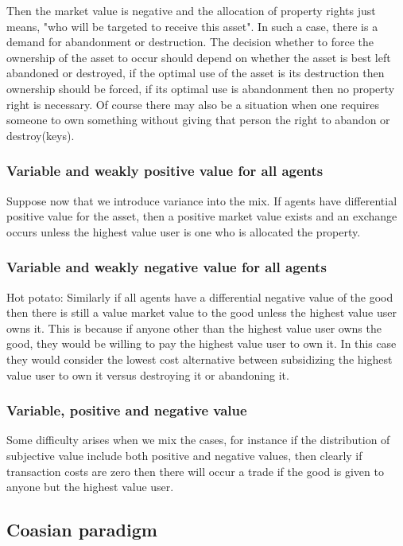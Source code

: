 \documentclass[12pt]{article}
\numberwithin{equation}{section}
\begin{document}
Then the market value is negative and the allocation of property rights just means,  "who will be targeted to receive this asset". In such a case, there is a demand for abandonment or destruction. The decision whether to force the ownership of the asset to occur should depend on whether the asset is best left abandoned or destroyed, if the optimal use of the asset is its destruction then ownership should be forced, if its optimal use is abandonment then no property right is necessary. Of course there may also be a situation when one requires someone to own something without giving that person the right to abandon or destroy(keys). 

\subsubsection{Variable and weakly positive value for all agents}

Suppose now that we introduce variance into the mix. If agents have differential positive value for the asset, then a positive market value exists and an exchange occurs unless the highest value user is one who is allocated the property.

\subsubsection{Variable and weakly negative value for all agents}

Hot potato: Similarly if all agents have a differential negative value of the good then there is still a value market value to the good unless the highest value user owns it. This is because if anyone other than the highest value user owns the good, they would be willing to pay the highest value user to own it. In this case they would consider the lowest cost alternative between subsidizing the highest value user to own it versus destroying it or abandoning it. 

\subsubsection{Variable, positive and negative value}

Some difficulty arises when we mix the cases, for instance if the distribution of subjective value include both positive and negative values, then clearly if transaction costs are zero then there will occur a trade if the good is given to anyone but the highest value user. 

\subsection{Coasian paradigm}
\end{document}
